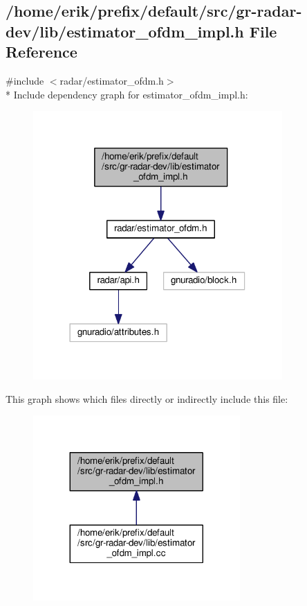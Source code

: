 \subsection{/home/erik/prefix/default/src/gr-\/radar-\/dev/lib/estimator\+\_\+ofdm\+\_\+impl.h File Reference}
\label{estimator__ofdm__impl_8h}
{\ttfamily \#include $<$radar/estimator\+\_\+ofdm.\+h$>$}\\*
Include dependency graph for estimator\+\_\+ofdm\+\_\+impl.\+h\+:
\nopagebreak
\begin{figure}[H]
\begin{center}
\leavevmode
\includegraphics[width=270pt]{da/dae/estimator__ofdm__impl_8h__incl}
\end{center}
\end{figure}
This graph shows which files directly or indirectly include this file\+:
\nopagebreak
\begin{figure}[H]
\begin{center}
\leavevmode
\includegraphics[width=224pt]{d4/d93/estimator__ofdm__impl_8h__dep__incl}
\end{center}
\end{figure}

